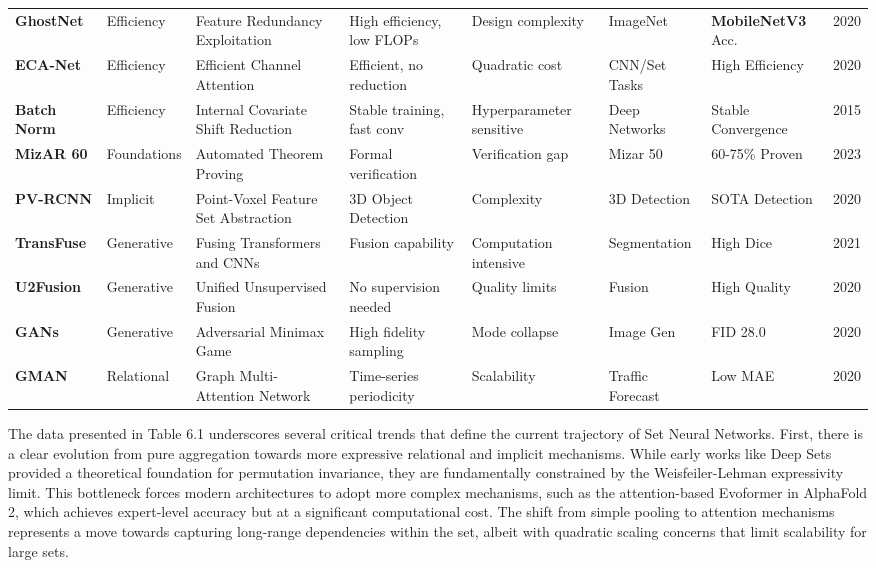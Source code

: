 \documentclass{article}
\begin{document}
\begin{table}[ht]
{\begin{tabular}{llllllll}
\textbf{GhostNet} & Efficiency & Feature Redundancy Exploitation & High efficiency, low FLOPs & Design complexity & ImageNet & \textbf{MobileNetV3} Acc. & 2020 \\
\textbf{ECA-Net} & Efficiency & Efficient Channel Attention & Efficient, no reduction & Quadratic cost & CNN/Set Tasks & High Efficiency & 2020 \\
\textbf{Batch Norm} & Efficiency & Internal Covariate Shift Reduction & Stable training, fast conv & Hyperparameter sensitive & Deep Networks & Stable Convergence & 2015 \\
\textbf{MizAR 60} & Foundations & Automated Theorem Proving & Formal verification & Verification gap & Mizar 50 & 60-75\% Proven & 2023 \\
\textbf{PV-RCNN} & Implicit & Point-Voxel Feature Set Abstraction & 3D Object Detection & Complexity & 3D Detection & SOTA Detection & 2020 \\
\textbf{TransFuse} & Generative & Fusing Transformers and CNNs & Fusion capability & Computation intensive & Segmentation & High Dice & 2021 \\
\textbf{U2Fusion} & Generative & Unified Unsupervised Fusion & No supervision needed & Quality limits & Fusion & High Quality & 2020 \\
\textbf{GANs} & Generative & Adversarial Minimax Game & High fidelity sampling & Mode collapse & Image Gen & FID 28.0 & 2020 \\
\textbf{GMAN} & Relational & Graph Multi-Attention Network & Time-series periodicity & Scalability & Traffic Forecast & Low MAE & 2020 \\
\bottomrule
\end{tabular}
}
\end{table}

The data presented in Table 6.1 underscores several critical trends that define the current trajectory of Set Neural Networks. First, there is a clear evolution from pure aggregation towards more expressive relational and implicit mechanisms. While early works like Deep Sets provided a theoretical foundation for permutation invariance, they are fundamentally constrained by the Weisfeiler-Lehman expressivity limit. This bottleneck forces modern architectures to adopt more complex mechanisms, such as the attention-based Evoformer in AlphaFold 2, which achieves expert-level accuracy but at a significant computational cost. The shift from simple pooling to attention mechanisms represents a move towards capturing long-range dependencies within the set, albeit with quadratic scaling concerns that limit scalability for large sets.
\end{document}
